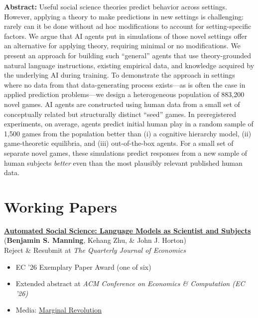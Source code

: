 \documentclass[margin,line,pifont,palatino,courier, 9pt]{res}
\begin{document}
\begin{resume}
\begin{singlespace}
\footnotesize
\textbf{Abstract:}
Useful social science theories predict behavior across settings. 
However, applying a theory to make predictions in new settings is challenging: rarely can it be done without ad hoc modifications to account for setting-specific factors.
We argue that AI agents put in simulations of those novel settings offer an alternative for applying theory, requiring minimal or no modifications.
We present an approach for building such ``general'' agents that use theory-grounded natural language instructions, existing empirical data, and knowledge acquired by the underlying AI during training.
To demonstrate the approach in settings where no data from that data-generating process exists---as is often the case in applied prediction problems---we design a heterogeneous population of 883,200 novel games.
AI agents are constructed using human data from a small set of conceptually related but structurally distinct ``seed'' games.
In preregistered experiments, on average, agents predict initial human play in a random sample of 1,500 games from the population better than (i) a cognitive hierarchy model, (ii) game-theoretic equilibria, and (iii) out-of-the-box agents.
For a small set of separate novel games, these simulations predict responses from a new sample of human subjects \emph{better} even than the most plausibly relevant published human data.
\end{singlespace}

\section{\sc Working Papers}

\href{https://www.nber.org/papers/w32381}{\bf Automated Social Science: Language Models as Scientist and Subjects}\\
(\textbf{Benjamin S. Manning}\footnotemark[\value{footnote}], Kehang Zhu\footnotemark[\value{footnote}], \& John J. Horton)\\
Reject \& Resubmit at \textit{The Quarterly Journal of Economics}
\vspace{0.25cm}
\begin{itemize}
\item EC '26 Exemplary Paper Award (one of six)
\item Extended abstract at \textit{ACM Conference on Economics \& Computation (EC '26)}
\item Media: \href{https://marginalrevolution.com/marginalrevolution/2024/03/its-happening-economic-science-edition.html}{Marginal Revolution}
\end{itemize}
\vspace{-0.25cm}


\end{resume}
\end{document}
